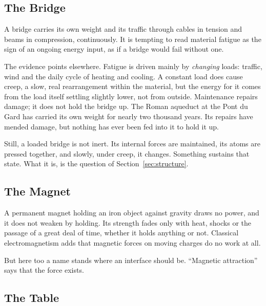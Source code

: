 \documentclass[11pt,a4paper]{article}
\begin{document}
\subsection*{The Bridge}

A bridge carries its own weight and its traffic through cables in tension and beams in compression, continuously. It is tempting to read material fatigue as the sign of an ongoing energy input, as if a bridge would fail without one.

The evidence points elsewhere. Fatigue is driven mainly by \emph{changing} loads: traffic, wind and the daily cycle of heating and cooling. A constant load does cause creep, a slow, real rearrangement within the material, but the energy for it comes from the load itself settling slightly lower, not from outside. Maintenance repairs damage; it does not hold the bridge up. The Roman aqueduct at the Pont du Gard has carried its own weight for nearly two thousand years. Its repairs have mended damage, but nothing has ever been fed into it to hold it up.

Still, a loaded bridge is not inert. Its internal forces are maintained, its atoms are pressed together, and slowly, under creep, it changes. Something sustains that state. What it is, is the question of Section~\ref{sec:structure}.

\subsection*{The Magnet}

A permanent magnet holding an iron object against gravity draws no power, and it does not weaken by holding. Its strength fades only with heat, shocks or the passage of a great deal of time, whether it holds anything or not. Classical electromagnetism adds that magnetic forces on moving charges do no work at all.

But here too a name stands where an interface should be. ``Magnetic attraction'' says that the force exists.  

\subsection*{The Table}
\end{document}
